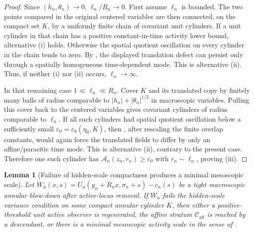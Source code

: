 \documentclass[11pt]{amsart}
\numberwithin{equation}{section}
\theoremstyle{plain}
\newtheorem{lemma}[theorem]{Lemma}
\theoremstyle{definition}
\theoremstyle{remark}
\newcommand{\Caff}{\mathcal C_{\mathrm{aff}}}
\begin{document}
\begin{proof}
Since \((h_n,\theta_n)\to0\), \(\ell_n/R_n\to0\).  First assume
\(\ell_n\) is bounded.  The two points compared in the original centered
variables are then connected, on the compact set \(K\), by a uniformly finite
chain of covariant unit cylinders.  If a unit cylinder in that chain has a
positive constant-in-time activity lower bound, alternative (i) holds.
Otherwise the spatial quotient oscillation on every cylinder in the chain tends to zero.
By , the displayed translation
defect can persist only through a spatially homogeneous time-dependent mode.
This is alternative (ii).  Thus, if neither (i) nor (ii) occurs,
\(\ell_n\to\infty\).

In that remaining case \(1\ll\ell_n\ll R_n\).  Cover \(K\) and its translated
copy by finitely many balls of radius comparable to \(|h_n|+|\theta_n|^{1/2}\)
in macroscopic variables.  Pulling this cover back to the centered variables
gives covariant cylinders of radius comparable to \(\ell_n\).  If all such
cylinders had spatial quotient oscillation below a sufficiently small
\(\varepsilon_0=\varepsilon_0(\eta_0,K)\), then
, after rescaling the finite
overlap constants, would again force the translated fields to differ by only an
affine/parasitic time mode.  This is alternative (ii), contrary to the present
case.  Therefore one such cylinder has
\(\mathcal A_n(z_n,r_n)\ge\varepsilon_0\) with \(r_n\sim\ell_n\), proving
(iii).
\end{proof}

\begin{lemma}[Failure of hidden-scale compactness produces a minimal mesoscopic scale]
\label{lem:h2-failure-first-bad-scale}
Let \(W_n(x,s)=U_n(y_n+R_nx,\sigma_n+s)-c_n(s)\) be a tight macroscopic
annular blow-down after active-locus removal.  If \(W_n\) fails the
hidden-scale variance condition on some compact annular cylinder \(K\), then
either a positive-threshold unit active observer is regenerated, the affine
stratum \(\Caff\) is reached by a descendant, or there is a minimal
mesoscopic activity scale in the sense of
.
\end{lemma}
\end{document}
